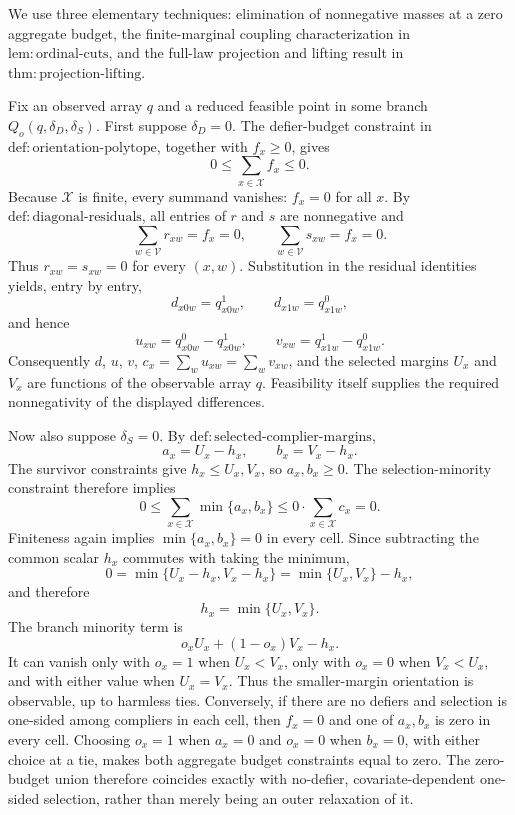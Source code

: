We use three elementary techniques: elimination of nonnegative masses at a zero aggregate budget, the finite-marginal coupling characterization in \(\mathrm{lem:ordinal\text{-}cuts}\), and the full-law projection and lifting result in \(\mathrm{thm:projection\text{-}lifting}\).

Fix an observed array \(q\) and a reduced feasible point in some branch \(Q_o(q,\delta_D,\delta_S)\).  First suppose \(\delta_D=0\).  The defier-budget constraint in \(\mathrm{def:orientation\text{-}polytope}\), together with \(f_x\geq0\), gives
\[
  0\leq \sum_{x\in\mathcal X}f_x\leq 0.
\]
Because \(\mathcal X\) is finite, every summand vanishes: \(f_x=0\) for all \(x\).  By \(\mathrm{def:diagonal\text{-}residuals}\), all entries of \(r\) and \(s\) are nonnegative and
\[
  \sum_{w\in\mathcal V}r_{xw}=f_x=0,
  \qquad
  \sum_{w\in\mathcal V}s_{xw}=f_x=0.
\]
Thus \(r_{xw}=s_{xw}=0\) for every \((x,w)\).  Substitution in the residual identities yields, entry by entry,
\[
  d_{x0w}=q^1_{x0w},
  \qquad
  d_{x1w}=q^0_{x1w},
\]
and hence
\[
  u_{xw}=q^0_{x0w}-q^1_{x0w},
  \qquad
  v_{xw}=q^1_{x1w}-q^0_{x1w}.
\]
Consequently \(d\), \(u\), \(v\), \(c_x=\sum_wu_{xw}=\sum_wv_{xw}\), and the selected margins \(U_x\) and \(V_x\) are functions of the observable array \(q\).  Feasibility itself supplies the required nonnegativity of the displayed differences.

Now also suppose \(\delta_S=0\).  By \(\mathrm{def:selected\text{-}complier\text{-}margins}\),
\[
  a_x=U_x-h_x,
  \qquad
  b_x=V_x-h_x.
\]
The survivor constraints give \(h_x\leq U_x,V_x\), so \(a_x,b_x\geq0\).  The selection-minority constraint therefore implies
\[
  0\leq \sum_{x\in\mathcal X}\min\{a_x,b_x\}
  \leq 0\cdot\sum_{x\in\mathcal X}c_x=0.
\]
Finiteness again implies \(\min\{a_x,b_x\}=0\) in every cell.  Since subtracting the common scalar \(h_x\) commutes with taking the minimum,
\[
  0=\min\{U_x-h_x,V_x-h_x\}
   =\min\{U_x,V_x\}-h_x,
\]
and therefore
\[
  h_x=\min\{U_x,V_x\}.
\]
The branch minority term is
\[
  o_xU_x+(1-o_x)V_x-h_x.
\]
It can vanish only with \(o_x=1\) when \(U_x<V_x\), only with \(o_x=0\) when \(V_x<U_x\), and with either value when \(U_x=V_x\).  Thus the smaller-margin orientation is observable, up to harmless ties.  Conversely, if there are no defiers and selection is one-sided among compliers in each cell, then \(f_x=0\) and one of \(a_x,b_x\) is zero in every cell.  Choosing \(o_x=1\) when \(a_x=0\) and \(o_x=0\) when \(b_x=0\), with either choice at a tie, makes both aggregate budget constraints equal to zero.  The zero-budget union therefore coincides exactly with no-defier, covariate-dependent one-sided selection, rather than merely being an outer relaxation of it.

